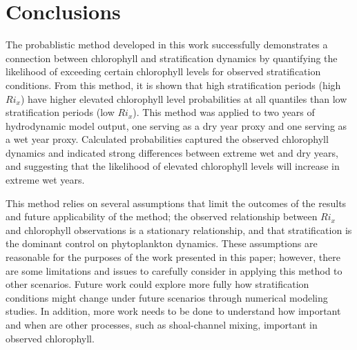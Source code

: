 \documentclass[preprint,review,12pt]{elsarticle}
\begin{document}
\section{Conclusions}\label{S:conclusion}
The probablistic method developed in this work successfully demonstrates a connection between chlorophyll and stratification dynamics by quantifying the likelihood of exceeding certain chlorophyll levels for observed stratification conditions. From this method, it is shown that high stratification periods (high \(Ri_x\)) have higher elevated chlorophyll level probabilities at all quantiles than low stratification periods (low \(Ri_x\)). This method was applied to two years of hydrodynamic model output, one serving as a dry year proxy and one serving as a wet year proxy. Calculated probabilities captured the observed chlorophyll dynamics and indicated strong differences between extreme wet and dry years, and suggesting that the likelihood of elevated chlorophyll levels will increase in extreme wet years. 

This method relies on several assumptions that limit the outcomes of the results and future applicability of the method; the observed relationship between \(Ri_x\) and chlorophyll observations is a stationary relationship, and that stratification is the dominant control on phytoplankton dynamics. These assumptions are reasonable for the purposes of the work presented in this paper; however, there are some limitations and issues to carefully consider in applying this method to other scenarios. Future work could explore more fully how stratification conditions might change under future scenarios through numerical modeling studies. In addition, more work needs to be done to understand how important and when are other processes, such as shoal-channel mixing, important in observed chlorophyll.













\end{document}

